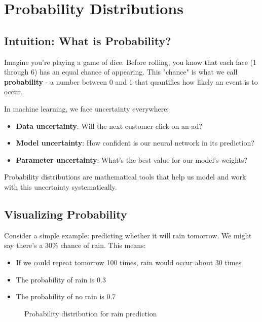 
\section{Probability Distributions }
\label{sec:probability-distributions}

\subsection{Intuition: What is Probability?}

Imagine you're playing a game of dice. Before rolling, you know that each face (1 through 6) has an equal chance of appearing. This "chance" is what we call \textbf{probability} - a number between 0 and 1 that quantifies how likely an event is to occur.

In machine learning, we face uncertainty everywhere:
\begin{itemize}
    \item \textbf{Data uncertainty}: Will the next customer click on an ad?
    \item \textbf{Model uncertainty}: How confident is our neural network in its prediction?
    \item \textbf{Parameter uncertainty}: What's the best value for our model's weights?
\end{itemize}

Probability distributions are mathematical tools that help us model and work with this uncertainty systematically.

\subsection{Visualizing Probability}

Consider a simple example: predicting whether it will rain tomorrow. We might say there's a 30\% chance of rain. This means:
\begin{itemize}
    \item If we could repeat tomorrow 100 times, rain would occur about 30 times
    \item The probability of rain is 0.3
    \item The probability of no rain is 0.7
\end{itemize}

\begin{figure}[h]
\centering
{}
\caption{Probability distribution for rain prediction}
\label{fig:rain-probability}
\end{figure}

